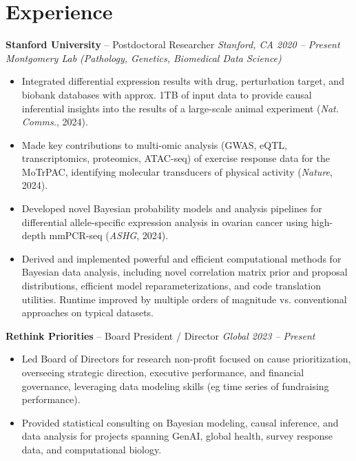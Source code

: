 \documentclass[10pt, letterpaper]{article}
\newenvironment{highlights}{
    \begin{itemize}[
        topsep=0.05 cm, %
        parsep=0.05 cm, %
        partopsep=0pt,
        itemsep=0pt,
        leftmargin=0.4 cm + 10pt, %
        label=\textbf{--} %
    ]
}{
    \end{itemize}
}
\begin{document}
    \vspace{-0.0 cm}
    \section{Experience}

        \textbf{Stanford University} -- Postdoctoral Researcher \hfill \textit{\textcolor{primaryColor}{Stanford, CA \textbar{} 2020 -- Present}} \\ %
        \textit{Montgomery Lab (Pathology, Genetics, Biomedical Data Science)} %
        \begin{highlights} %
            \item Integrated differential expression results with drug, perturbation target, and biobank databases with approx. 1TB of input data to provide causal inferential insights into the results of a large-scale animal experiment (\textit{Nat. Comms.}, 2024). 
            \item Made key contributions to multi-omic analysis (GWAS, eQTL, transcriptomics, proteomics, ATAC-seq) of exercise response data for the MoTrPAC, identifying molecular transducers of physical activity (\textit{Nature}, 2024). 
            \item Developed novel Bayesian probability models and analysis pipelines for differential allele-specific expression analysis in ovarian cancer using high-depth mmPCR-seq (\textit{ASHG}, 2024).
            \item Derived and implemented powerful and efficient computational methods for Bayesian data analysis, including novel correlation matrix prior and proposal distributions, efficient model reparameterizations, and code translation utilities. Runtime improved by multiple orders of magnitude vs. conventional approaches on typical datasets.
        \end{highlights}

        \vspace{0.15 cm} %

        \textbf{Rethink Priorities} -- Board President / Director \hfill \textit{\textcolor{primaryColor}{Global \textbar{} 2023 -- Present}} %
        \begin{highlights}
             \item Led Board of Directors for research non-profit focused on cause prioritization, overseeing strategic direction, executive performance, and financial governance, leveraging data modeling skills (eg time series of fundraising performance).
             \item Provided statistical consulting on Bayesian modeling, causal inference, and data analysis for projects spanning GenAI, global health, survey response data, and computational biology. 
         \end{highlights}
\end{document}
